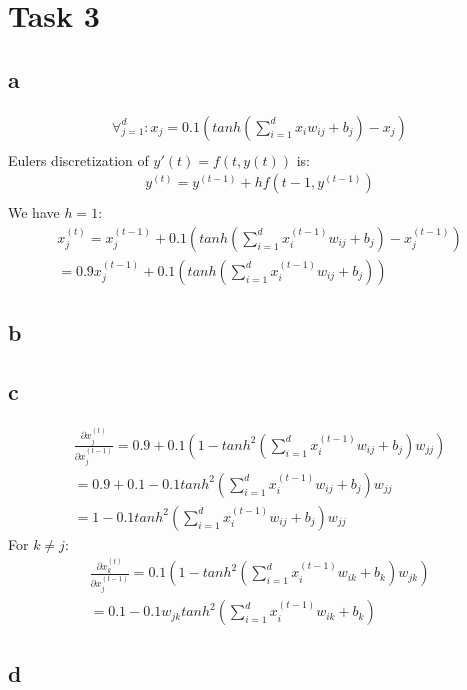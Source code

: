 \section*{Task 3}

\subsection*{a}

\begin{gather*}
\forall_{j=1}^d : x_j = 0.1(tanh(\sum_{i=1}^d x_i w_{ij} + b_j) - x_j) \\
\end{gather*}
Eulers discretization of $y'(t) = f(t,y(t))$ is: 
\begin{gather*}
y^{(t)} = y^{(t-1)} + hf(t-1, y^{(t-1)}) \\
\end{gather*}
We have $h=1$: 
\begin{gather*}
x_j^{(t)} = x_j^{(t-1)} + 0.1(tanh(\sum_{i=1}^d x_i^{(t-1)} w_{ij} + b_j) - x_j^{(t-1)}) \\
= 0.9 x_j^{(t-1)} + 0.1(tanh(\sum_{i=1}^d x_i^{(t-1)} w_{ij} + b_j))
\end{gather*}


\subsection*{b}

\subsection*{c}
\begin{gather*}
\frac{\partial x_j^{(t)}}{\partial x_j^{(t-1)}} = 0.9 + 0.1(1 - tanh^2(\sum_{i=1}^d x_i^{(t-1)} w_{ij} + b_j) w_{jj}) \\
= 0.9 + 0.1 - 0.1 tanh^2(\sum_{i=1}^d x_i^{(t-1)} w_{ij} + b_j) w_{jj} \\
= 1 - 0.1 tanh^2(\sum_{i=1}^d x_i^{(t-1)} w_{ij} + b_j) w_{jj}
\end{gather*}
For $k \neq j$: 
\begin{gather*}
\frac{\partial x_k^{(t)}}{\partial x_j^{(t-1)}} = 0.1(1 - tanh^2(\sum_{i=1}^d x_i^{(t-1)} w_{ik} + b_k) w_{jk}) \\
= 0.1 - 0.1 w_{jk} tanh^2(\sum_{i=1}^d x_i^{(t-1)} w_{ik} + b_k)
\end{gather*}

\subsection*{d}

